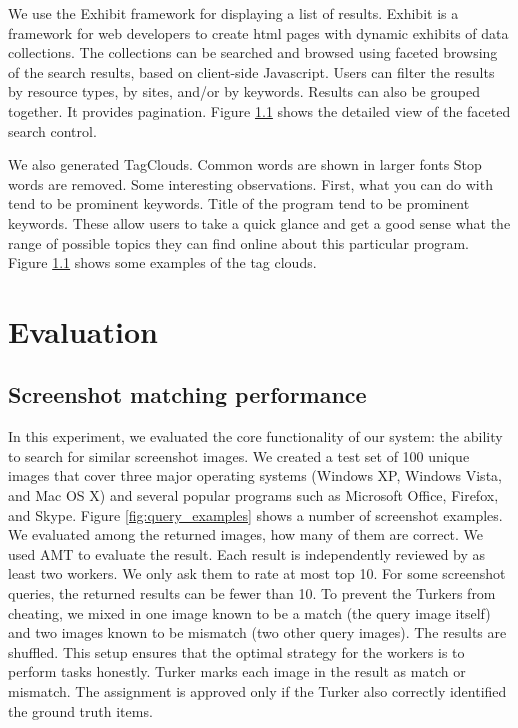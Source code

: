 \documentclass{www2010-submission}
\begin{document}
We use the Exhibit framework for displaying a list of results.
Exhibit is a framework for web developers to create html pages
with dynamic exhibits of data collections. The collections can be
searched and browsed using faceted browsing of the search results,
based on client-side Javascript. Users can filter the results by
resource types, by sites, and/or by keywords. Results can also be
grouped together. It provides pagination. Figure \ref{} shows the
detailed view of the faceted search control.

We also generated TagClouds. Common words are shown in larger fonts
Stop words are removed. Some interesting observations. First, what you
can do with tend to be prominent keywords. Title of the program tend
to be prominent keywords. These allow users to take a quick glance and
get a good sense what the range of possible topics they can find
online about this particular program. Figure \ref{} shows some
examples of the tag clouds.

\section{Evaluation}


\subsection{Screenshot matching performance}

In this experiment, we evaluated the core functionality of our system:
the ability to search for similar screenshot images.  We created a
test set of 100 unique images that cover three major operating systems
(Windows XP, Windows Vista, and Mac OS X) and several popular programs
such as Microsoft Office, Firefox, and Skype. Figure
\ref{fig:query_examples} shows a number of screenshot examples.  We
evaluated among the returned images, how many of them are correct. We
used AMT to evaluate the result. Each result is independently reviewed
by as least two workers. We only ask them to rate at most top 10. For
some screenshot queries, the returned results can be fewer than 10. To
prevent the Turkers from cheating, we mixed in one image known to be a
match (the query image itself) and two images known to be mismatch
(two other query images). The results are shuffled. This setup ensures
that the optimal strategy for the workers is to perform tasks
honestly. Turker marks each image in the result as match or
mismatch. The assignment is approved only if the Turker also correctly
identified the ground truth items.
\end{document}
